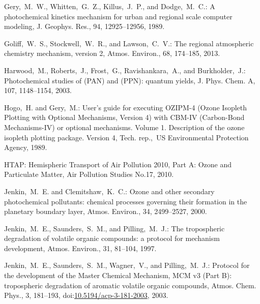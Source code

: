 \documentclass[acpd, online, hvmath]{copernicus}
\begin{document}
\begin{thebibliography}{34}
 Gery,~M.~W., Whitten,~G.~Z., Killus,~J.~P., and
  Dodge,~M.~C.: {A photochemical kinetics mechanism for urban and
    regional scale computer modeling}, J. Geophys. Res., 94,
  12925--12956, 1989.


 Goliff,~W.~S., Stockwell,~W.~R., and
  Lawson,~C.~V.: {The regional atmospheric chemistry mechanism,
    version 2}, Atmos. Environ., 68, 174--185, 2013.


 Harwood,~M., Roberts,~J.,
  Frost,~G., Ravishankara,~A., and Burkholder,~J.: {Photochemical
    studies of  (PAN) and
     (PPN):  quantum yields},
  J. Phys. Chem. A, 107, 1148--1154, 2003.


 Hogo,~H. and Gery,~M.:
  User's guide for executing OZIPM-4 (Ozone Isopleth Plotting with
  Optional Mechanisms, Version 4) with CBM-IV (Carbon-Bond
  Mechanisms-IV) or optional mechanisms. Volume 1. Description of the
  ozone isopleth plotting package. Version 4, Tech. rep.,~US
  Environmental Protection Agency, 1989.


 HTAP: {Hemispheric Transport of Air
    Pollution 2010, Part A: Ozone and Particulate Matter, Air
    Pollution Studies No.17}, 2010. 


 Jenkin,~M.~E. and
  Clemitshaw,~K.~C.: {Ozone and other secondary photochemical
    pollutants: chemical processes governing their formation in the
    planetary boundary layer}, Atmos. Environ., 34, 2499--2527,
  2000.


 Jenkin,~M.~E., Saunders,~S.~M., and
  Pilling,~M.~J.: {The tropospheric degradation of volatile organic
    compounds: a protocol for mechanism development}, Atmos. Environ.,
  31, 81--104, 1997.


 Jenkin,~M.~E., Saunders,~S.~M., Wagner,~V.,
  and Pilling,~M.~J.: Protocol for the development of the Master
  Chemical Mechanism, MCM v3 (Part B): tropospheric degradation of
  aromatic volatile organic compounds, Atmos. Chem. Phys., 3,
  181--193,
doi:\href{http://dx.doi.org/10.5194/acp-3-181-2003}{10.5194/acp-3-181-2003},
  2003.




\end{thebibliography}
\end{document}
